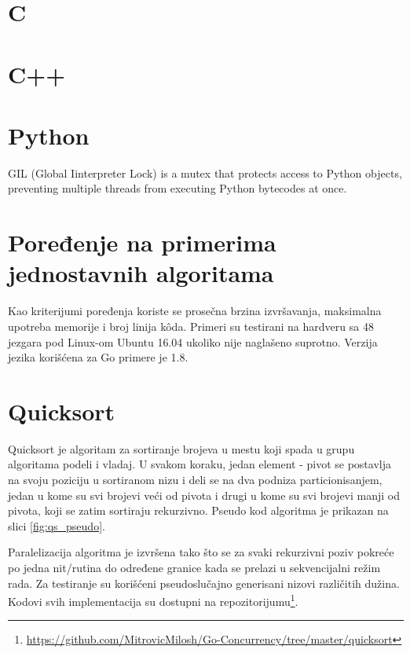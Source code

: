 \documentclass[12pt,oneside]{memoir}
\begin{document}
\section{C}

\section{C++}

\section{Python}
\label{gil} GIL (Global Iinterpreter Lock) is a mutex that protects access to Python objects, preventing multiple threads from executing Python bytecodes at once.

\section{Poređenje na primerima jednostavnih algoritama}
Kao kriterijumi poređenja koriste se prosečna brzina izvršavanja, maksimalna upotreba memorije i broj linija k\^{o}da. Primeri su testirani na hardveru sa 48 jezgara pod Linux-om Ubuntu 16.04 ukoliko nije naglašeno suprotno. Verzija jezika korišćena za Go primere je 1.8.



\section{Quicksort}
Quicksort je algoritam za sortiranje brojeva u mestu koji spada u grupu algoritama podeli i vladaj. U svakom koraku, jedan element - pivot se postavlja na svoju poziciju u sortiranom nizu i deli se na dva podniza particionisanjem, jedan u kome su svi brojevi veći od pivota i drugi u kome su svi brojevi manji od pivota, koji se zatim sortiraju rekurzivno.  Pseudo kod algoritma je prikazan na slici \ref{fig:qs_pseudo}. 

Paralelizacija algoritma je izvršena tako što se za svaki rekurzivni poziv pokreće po jedna nit/rutina do određene granice kada se prelazi u sekvencijalni režim rada. Za testiranje su korišćeni pseudoslučajno generisani nizovi različitih dužina. Kodovi svih implementacija su dostupni na repozitorijumu\footnote{\url{https://github.com/MitrovicMilosh/Go-Concurrency/tree/master/quicksort}}.
\end{document}
